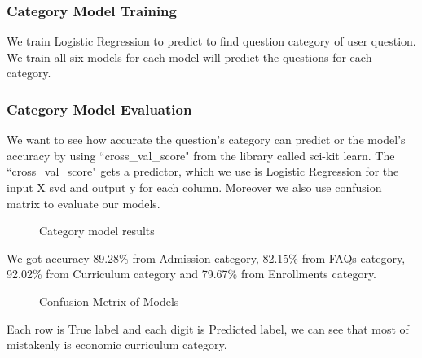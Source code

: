 \documentclass[12pt,oneside,openright,a4paper]{cpe-english-project}
\begin{document}
\subsubsection{Category Model Training}
We train Logistic Regression to predict to find question category of user question. We train all six models for each model will predict the questions for each category.
\subsubsection{Category Model Evaluation}
We want to see how accurate the question's category can predict or the model's accuracy by using ``cross\_val\_score" from the library called sci-kit learn.
The ``cross\_val\_score" gets a predictor, which we use is Logistic Regression for the input X svd and output y for each column. Moreover we also use confusion matrix to evaluate our models.

\begin{figure}[!h]\centering
{}
\caption{Category model results}\label{fig:Category Model Results}
\end{figure}
We got accuracy 89.28\% from Admission category, 82.15\% from FAQs category, 92.02\% from Curriculum category and 79.67\% from Enrollments category.
\pagebreak
\begin{figure}[!h]\centering
{}
\caption{Confusion Metrix of Models}\label{fig:Confusion Metrix of Models}
\end{figure}
Each row is True label and each digit is Predicted label, we can see that most of mistakenly is economic curriculum category. 
\end{document}
